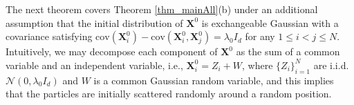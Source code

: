 \documentclass[]{elsarticle}
\newcommand{\cov}{\mathrm{cov}}
\newcommand{\mbf}[1]{\boldsymbol{#1}}
\newcommand{\bX}{\mbf{X}}
\numberwithin{equation}{section}
\numberwithin{theorem}{section}
\begin{document}
\bigskip
The next theorem covers Theorem \ref{thm_mainAll}(b) under an additional assumption that the initial distribution of $\bX^0$ is exchangeable Gaussian with a covariance satisfying $\cov(\bX_i^0)-\cov(\bX_i^0,\bX_j^0)=\lambda_0 I_d$ for any $1\leq i<j\leq N$. 
Intuitively, we may decompose each component of $\bX^0$ as the sum of a common variable and an independent variable, i.e., $\bX_i^0 = Z_i+ W$, where $\{Z_i\}_{i=1}^N$ are i.i.d. $\mathcal{N}(0,\lambda_0 I_d)$ and $W$ is a common Gaussian random variable, and this implies that the  particles are initially scattered randomly around a random position.   
 
\end{document}
